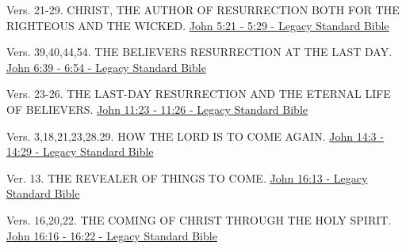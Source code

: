 \documentclass[
  ignorenonframetext,
]{beamer}
\begin{document}
\begin{frame}{5}
\label{section-179}
\begin{block}{Vers. 21-29. CHRIST, THE AUTHOR OF RESURRECTION BOTH FOR
THE RIGHTEOUS AND THE WICKED.}
\label{vers.-21-29.-christ-the-author-of-resurrection-both-for-the-righteous-and-the-wicked.}
\href{https://read.lsbible.org/?q=john5\%3A21-29}{John 5:21 - 5:29 -
Legacy Standard Bible}
\end{block}
\end{frame}

\begin{frame}{6}
\label{section-180}
Vers. 39,40,44,54. THE BELIEVER\textquotesingle S RESURRECTION AT THE
LAST DAY.\\
\href{https://read.lsbible.org/?q=john6\%3A39-54}{John 6:39 - 6:54 -
Legacy Standard Bible}
\end{frame}

\begin{frame}{11}
\label{section-181}
\begin{block}{Vers. 23-26. THE LAST-DAY RESURRECTION AND THE ETERNAL
LIFE OF BELIEVERS.}
\label{vers.-23-26.-the-last-day-resurrection-and-the-eternal-life-of-believers.}
\href{https://read.lsbible.org/?q=john11\%3A23-26}{John 11:23 - 11:26 -
Legacy Standard Bible}
\end{block}
\end{frame}

\begin{frame}{14}
\label{section-182}
\begin{block}{Vers. 3,18,21,23,28.29. HOW THE LORD IS TO COME AGAIN.}
\label{vers.-318212328.29.-how-the-lord-is-to-come-again.}
\href{https://read.lsbible.org/?q=john14\%3A3-29}{John 14:3 - 14:29 -
Legacy Standard Bible}
\end{block}
\end{frame}

\begin{frame}{16}
\label{section-183}
\begin{block}{Ver. 13. THE REVEALER OF THINGS TO COME.}
\label{ver.-13.-the-revealer-of-things-to-come.}
\href{https://read.lsbible.org/?q=john16\%3A13}{John 16:13 - Legacy
Standard Bible}
\end{block}

\begin{block}{Vers. 16,20,22. THE COMING OF CHRIST THROUGH THE HOLY
SPIRIT.}
\label{vers.-162022.-the-coming-of-christ-through-the-holy-spirit.}
\href{https://read.lsbible.org/?q=john16\%3A16-22}{John 16:16 - 16:22 -
Legacy Standard Bible}
\end{block}
\end{frame}
\end{document}
